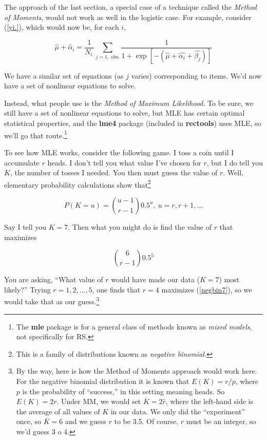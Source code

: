 The approach of the last section, a special case of a technique called
the \textit{Method of Moments}, would not work as well in the logistic
case.  For example, consider (\ref{yi.}), which would now be, for each
$i$,

\begin{equation}
\label{nonlin1}
\widehat{\mu} + \widehat{\alpha}_i = 
\frac{1}{N_{i.}} \sum_{j=1, \textrm{ obs.}}
\frac{1}{1 + \exp[-(\widehat{\mu} + \widehat{\alpha_i} + \widehat{\beta_j})]}
\end{equation}

We have a similar set of equations (as $j$ varies) corresponding to
items.  We'd now have a set of nonlinear equations to solve.

Instead, what people use is the \textit{Method of Maximum Likelihood}.
To be sure, we still have a set of nonlinear equations to solve, but MLE
has certain optimal statistical properties, and the \textbf{lme4}
package (included in \textbf{rectools}) uses MLE, so we'll go that
route.\footnote{The \textbf{mle} package is for a general class of
methods known as \textit{mixed models}, not specifically for RS.}

To see how MLE works, consider the following game.  I toss a coin until
I accumulate $r$ heads.  I don't tell you what value I've chosen for
$r$, but I do tell you $K$, the number of tosses I needed.  You then
must guess the value of $r$.  Well, elementary probability calculations 
show that\footnote{This is a family of distributions known as
\textit{negative binomial.}}

\begin{equation}
\label{negbin}
P(K = u) = \binom{u-1}{r-1} 0.5^u,~ u = r, r+1, ...
\end{equation}

Say I tell you $K = 7$.  Then what you might do is find the value of $r$
that maximizes 

\begin{equation}
\label{negbin7}
\binom{6}{r-1} 0.5^5
\end{equation}

You are asking, ``What value of $r$ would have made our data ($K = 7$)
most likely?''  Trying $r = 1,2,...,5$, one finds that $r = 4$ maximizes
(\ref{negbin7}), so we would take that as our guess.\footnote{By the
way, here is how the Method of Moments approach would work here. For the
negative binomial distribution it is known that $E(K) = r/p$, where $p$
is the probability of ``success,'' in this setting meaning heads.  So
$E(K) = 2r$.  Under MM, we would set $\overline{K} = 2 \widehat{r}$,
where the left-hand side is the average of all values of $K$ in our
data.  We only did the ``experiment'' once, so $\overline{K} = 6$ and we
guess $r$ to be 3.5.  Of course, $r$ must be an integer, so we'd guess 3
o 4.}

